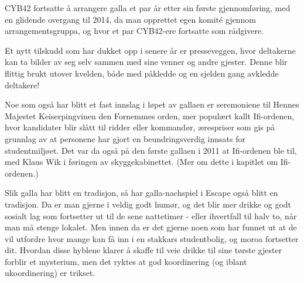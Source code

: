 CYB42 fortsatte å arrangere galla et par år etter sin første gjennomføring, med en glidende overgang til 2014, da man opprettet egen komité gjennom arrangementsgruppa, og hvor et par CYB42-ere fortsatte som rådgivere.

Et nytt tilskudd som har dukket opp i senere år er presseveggen, hvor deltakerne kan ta bilder av seg selv sammen med sine venner og andre gjester. Denne blir flittig brukt utover kvelden, både med påkledde og en sjelden gang avkledde deltakere!

Noe som også har blitt et fast innslag i løpet av gallaen er seremoniene til Hennes Majestet Keiserpingvinen den Fornemmes orden, mer populært kallt Ifi-ordenen, hvor kandidater blir slått til ridder eller kommandør, ærespriser som gis på grunnlag av at personene har gjort en beundringsverdig innsats for studentmiljøet. Det var da også på den første gallaen i 2011 at Ifi-ordenen ble til, med Klaus Wik i føringen av skyggekabinettet. (Mer om dette i kapitlet om Ifi-ordenen.)

Slik galla har blitt en tradisjon, så har galla-nachspiel i Escape også blitt en tradisjon. Da er man gjerne i veldig godt humør, og det blir mer drikke og godt sosialt lag som fortsetter ut til de sene nattetimer - eller ihvertfall til halv to, når man må stenge lokalet. Men innen da er det gjerne noen som har funnet ut at de vil utfordre hvor mange kan få inn i en stakkars studentbolig, og moroa fortsetter dit. Hvordan disse hyblene klarer å skaffe til veie drikke til sine tørste gjester forblir et mysterium, men det ryktes at god koordinering (og iblant ukoordinering) er trikset.
